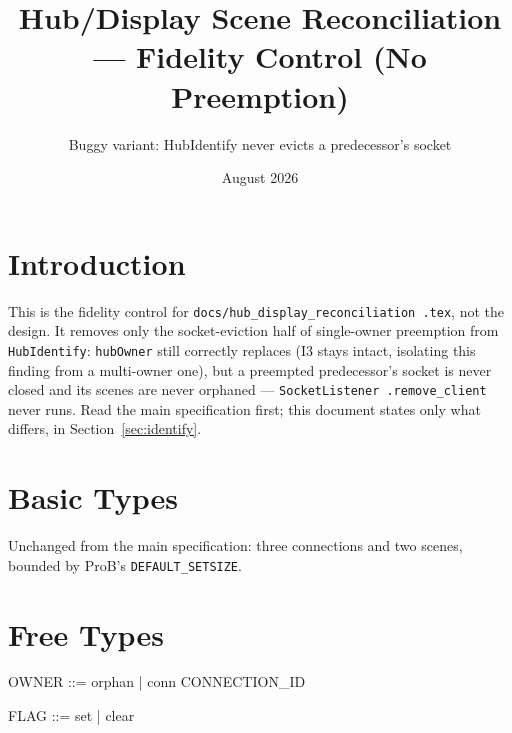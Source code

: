 \documentclass[a4paper,10pt,fleqn]{article}
\begin{document}
\title{Hub/Display Scene Reconciliation --- Fidelity Control (No Preemption)}
\author{Buggy variant: HubIdentify never evicts a predecessor's socket}
\date{August 2026}
\maketitle

\section{Introduction}

This is the fidelity control for \texttt{docs/hub\_display\_reconciliation
.tex}, not the design.  It removes only the socket-eviction half of
single-owner preemption from \texttt{HubIdentify}: \texttt{hubOwner} still
correctly replaces (I3 stays intact, isolating this finding from a
multi-owner one), but a preempted predecessor's socket is never closed
and its scenes are never orphaned --- \texttt{SocketListener
.remove\_client} never runs.  Read the main specification first; this
document states only what differs, in Section~\ref{sec:identify}.

\section{Basic Types}

\begin{zed}
\end{zed}

Unchanged from the main specification: three connections and two scenes,
bounded by ProB's \texttt{DEFAULT\_SETSIZE}.

\section{Free Types}

\begin{zed}
  OWNER ::= orphan | conn \ldata CONNECTION\_ID \rdata
\end{zed}

\begin{zed}
  FLAG ::= set | clear
\end{zed}
\end{document}

